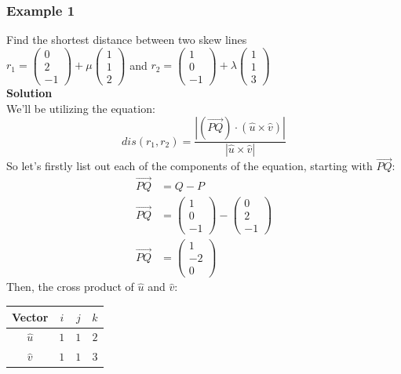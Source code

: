 \documentclass[hidelinks, a4paper, 12pt]{article}
\newcommand{\bd}{\textbf}
\newcommand{\n}{\\[\baselineskip]}
\begin{document}
            \subsubsection{Example 1}
                Find the shortest distance between two skew lines\n
                $r_1 = \begin{pmatrix} 0\\2\\-1 \end{pmatrix} + \mu\begin{pmatrix} 1\\1\\2 \end{pmatrix}$ and
                $r_2 = \begin{pmatrix} 1\\0\\-1 \end{pmatrix} + \lambda\begin{pmatrix} 1\\1\\3 \end{pmatrix}$\n
                \bd{Solution}\n
                We'll be utilizing the equation:
                \[dis(r_1, r_2) = \frac{|(\vec{PQ}) \cdot (\hat{u} \times \hat{v})|}{|\hat{u} \times \hat{v}|}\]
                So let's firstly list out each of the components of the equation, starting with $\vec{PQ}$:
                \[\begin{split}
                    \vec{PQ} &= Q - P\\
                    \vec{PQ} &= \begin{pmatrix} 1\\0\\-1 \end{pmatrix} - \begin{pmatrix} 0\\2\\-1 \end{pmatrix}\\
                    \vec{PQ} &= \begin{pmatrix} 1 \\ -2 \\ 0 \end{pmatrix}
                \end{split}\]
                Then, the cross product of $\hat{u}$ and $\hat{v}$:
                \begin{center}
                    \begin{tabular}{|c || c | c | c|} 
                    \hline
                    Vector & $i$ & $j$ & $k$ \\
                    \hline
                    $\hat{u}$ & $1$ & $1$ & $2$ \\ 
                    \hline
                    $\hat{v}$ & $1$ & $1$ & $3$ \\
                    \hline
                   \end{tabular}
                \end{center}
\end{document}
